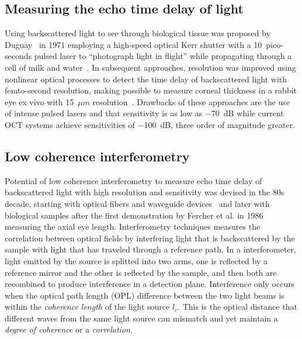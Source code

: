 \subsection{Measuring the echo time delay of light}

Using backscattered light to see through biological tissue was proposed by Duguay~\cite{} in 1971 employing a high-speed optical Kerr shutter with a 10~pico-seconds pulsed laser to ``photograph light in flight'' while propagating through a cell of milk and water~\cite{}. In subsequent approaches, resolution was improved using nonlinear optical processes to detect the time delay of backscattered light with femto-second resolution, making possible to measure corneal thickness in a rabbit eye ex vivo with 15~$\mu m$ resolution~\cite{}. Drawbacks of these approaches are the use of intense pulsed lasers and that sensitivity is as low as $-$70~dB while current OCT systems achieve sensitivities of $-$100~dB, three order of magnitude greater.

\subsection{Low coherence interferometry}

Potential of low coherence interferometry to measure echo time delay of backscattered light with high resolution and sensitivity was devised in the 80s decade, starting with optical fibers and waveguide devices~\cite{} and later with biological samples after the first demonstration by Fercher et al. in 1986~\cite{} measuring the axial eye length. Interferometry techniques measures the correlation between optical fields by interfering light that is backscattered by the sample with light that has traveled through a reference path. In a interferometer, light emitted by the source is splitted into two arms, one is reflected by a reference mirror and the other is reflected by the sample, and then both are recombined to produce interference in a detection plane. Interference only occurs when the optical path length (OPL) difference between the two light beams is within the \textit{coherence length} of the light source $l_c$. This is the optical distance that different waves from the same light source can mismatch and yet maintain a \textit{degree of coherence} or a \textit{correlation}. %

